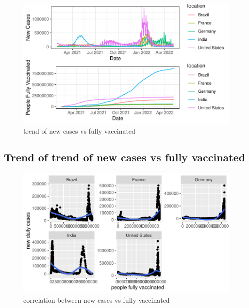 \documentclass[11pt,a4paper,]{article}
\begin{document}
\begin{figure}

{\centering \includegraphics{report_files/figure-latex/figure4-1} 

}

\caption{trend of new cases vs fully vaccinated}\label{fig:figure4}
\end{figure}

\clearpage

\subsection*{Trend of trend of new cases vs fully vaccinated}

\begin{figure}

{\centering \includegraphics{report_files/figure-latex/figure5-1} 

}

\caption{correlation between new cases vs fully vaccinated}\label{fig:figure5}
\end{figure}
\end{document}
